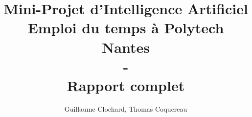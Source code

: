 \documentclass[a4paper]{article}
\begin{document}

\title{Mini-Projet d'Intelligence Artificiel \\
    Emploi du temps à Polytech Nantes \\
    - \\
    Rapport complet}
\author{Guillaume Clochard, Thomas Coquereau}
\maketitle





\newpage

\newpage

\newpage

\end{document}
